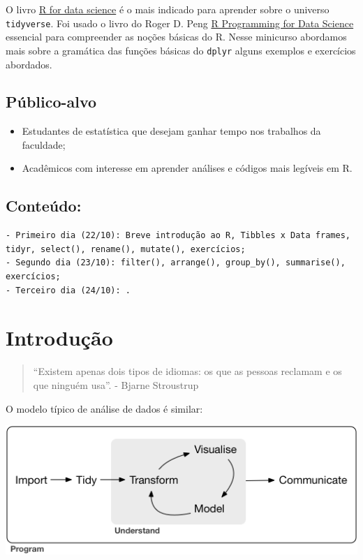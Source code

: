 \documentclass[]{book}
\providecommand{\tightlist}{%
  \setlength{\itemsep}{0pt}\setlength{\parskip}{0pt}}
\begin{document}
O livro \href{https://r4ds.had.co.nz/}{R for data science} é o mais indicado para aprender sobre o universo \texttt{tidyverse}. Foi usado o livro do Roger D. Peng \href{https://bookdown.org/rdpeng/rprogdatascience/}{R Programming for Data Science} essencial para compreender as noções básicas do R. Nesse minicurso abordamos mais sobre a gramática das funções básicas do \texttt{dplyr} alguns exemplos e exercícios abordados.

\hypertarget{puxfablico-alvo}{%
\section{Público-alvo}\label{puxfablico-alvo}}

\begin{itemize}
\tightlist
\item
  Estudantes de estatística que desejam ganhar tempo nos trabalhos da faculdade;
\item
  Acadêmicos com interesse em aprender análises e códigos mais legíveis em R.
\end{itemize}

\hypertarget{conteuxfado}{%
\section{Conteúdo:}\label{conteuxfado}}

\begin{verbatim}
- Primeiro dia (22/10): Breve introdução ao R, Tibbles x Data frames,
tidyr, select(), rename(), mutate(), exercícios; 
- Segundo dia (23/10): filter(), arrange(), group_by(), summarise(),
exercícios;
- Terceiro dia (24/10): .
\end{verbatim}

\hypertarget{intro}{%
\chapter{Introdução}\label{intro}}

\begin{quote}
``Existem apenas dois tipos de idiomas: os que as pessoas reclamam e os que ninguém usa''. - Bjarne Stroustrup
\end{quote}

O modelo típico de análise de dados é similar:

\begin{center}\includegraphics[width=0.75\linewidth]{imagens/data-science} \end{center}
\end{document}
